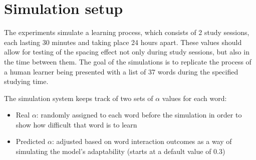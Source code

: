 \documentclass[a4paper]{report}
\begin{document}
\section{Simulation setup}
The experiments simulate a learning process, which consists of 2 study sessions, each lasting 30 minutes and taking place 24 hours apart. These values should allow for testing of the spacing effect not only during study sessions, but also in the time between them. The goal of the simulations is to replicate the process of a human learner being presented with a list of 37 words during the specified studying time.

The simulation system keeps track of two sets of $\alpha$ values for each word:
\begin{itemize}
    \item Real $\alpha$: randomly assigned to each word before the simulation in order to show how difficult that word is to learn
    \item Predicted $\alpha$: adjusted based on word interaction outcomes as a way of simulating the model's adaptability (starts at a default value of 0.3)
\end{itemize}
    
\end{document}
